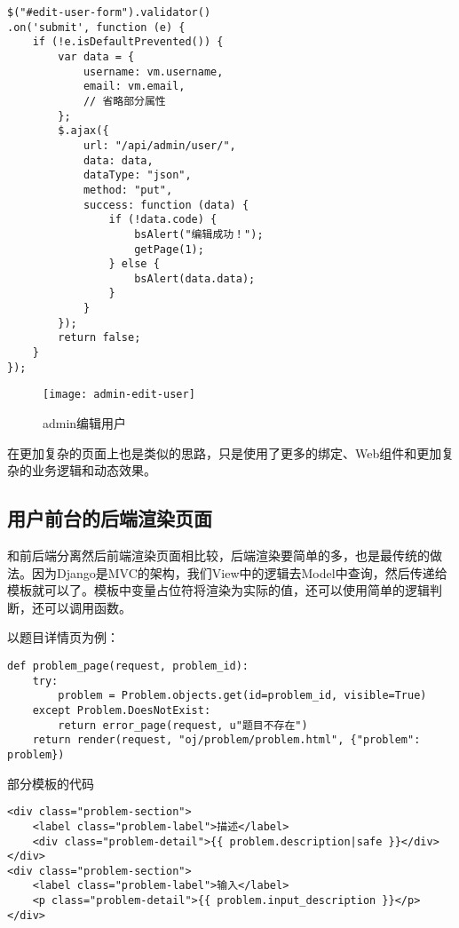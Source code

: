\begin{verbatim}
$("#edit-user-form").validator()
.on('submit', function (e) {
    if (!e.isDefaultPrevented()) {
        var data = {
            username: vm.username,
            email: vm.email,
            // 省略部分属性
        };
        $.ajax({
            url: "/api/admin/user/",
            data: data,
            dataType: "json",
            method: "put",
            success: function (data) {
                if (!data.code) {
                    bsAlert("编辑成功！");
                    getPage(1);
                } else {
                    bsAlert(data.data);
                }
            }
        });
        return false;
    }
});
\end{verbatim}

\begin{figure}[H]
\centering
\texttt{[image: admin-edit-user]}
\caption{admin编辑用户}
\end{figure}

在更加复杂的页面上也是类似的思路，只是使用了更多的绑定、Web组件和更加复杂的业务逻辑和动态效果。

\subsection{用户前台的后端渲染页面}

和前后端分离然后前端渲染页面相比较，后端渲染要简单的多，也是最传统的做法。因为Django是MVC的架构，我们View中的逻辑去Model中查询，然后传递给模板就可以了。模板中变量占位符将渲染为实际的值，还可以使用简单的逻辑判断，还可以调用函数。

以题目详情页为例：

\begin{verbatim}
def problem_page(request, problem_id):
    try:
        problem = Problem.objects.get(id=problem_id, visible=True)
    except Problem.DoesNotExist:
        return error_page(request, u"题目不存在")
    return render(request, "oj/problem/problem.html", {"problem": problem})
\end{verbatim}

部分模板的代码

\begin{verbatim}
<div class="problem-section">
    <label class="problem-label">描述</label>
    <div class="problem-detail">{{ problem.description|safe }}</div>
</div>
<div class="problem-section">
    <label class="problem-label">输入</label>
    <p class="problem-detail">{{ problem.input_description }}</p>
</div>
\end{verbatim}